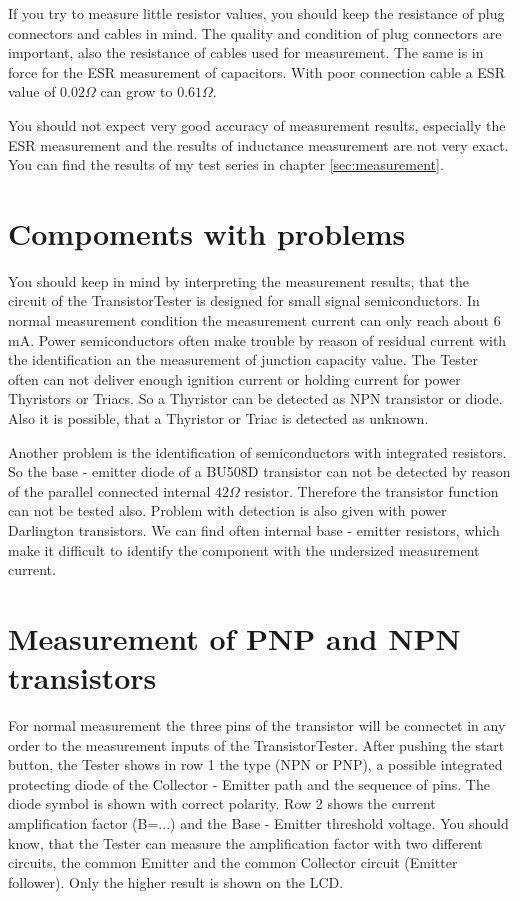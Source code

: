 If you try to measure little resistor values, you should keep the resistance of plug connectors and cables in mind.
The quality and condition of plug connectors are important, also the resistance of cables used for measurement.
The same is in force for the ESR measurement of capacitors.
With poor connection cable a ESR value of \(0.02 \Omega\) can grow to \(0.61 \Omega\).

You should not expect very good accuracy of measurement results, especially the ESR measurement and the results of inductance measurement are not very exact.
You can find the results of my test series in chapter \ref{sec:measurement}.

\section{Compoments with problems}
You should keep in mind by interpreting the measurement results, that the circuit of the TransistorTester is
designed for small signal semiconductors. In normal measurement condition the measurement current can only reach about 6 mA.
Power semiconductors often make trouble by reason of residual current with the identification an the measurement of junction capacity value.
The Tester often can not deliver enough ignition current or holding current for power Thyristors or Triacs.
So a Thyristor can be detected as NPN transistor or diode. Also it is possible, that a Thyristor or Triac is detected as unknown.

Another problem is the identification of semiconductors with integrated resistors.
So the base - emitter diode of a BU508D transistor can not be detected by reason of the parallel connected
internal \(42 \Omega\) resistor.
Therefore the transistor function can not be tested also.
Problem with detection is also given with power Darlington transistors. We can find often internal
base - emitter resistors, which make it difficult to identify the component with the undersized measurement current.

\section{Measurement of PNP and NPN transistors}
For normal measurement the three pins of the transistor will be connectet in any order to the measurement
inputs of the TransistorTester.
After pushing the start button, the Tester shows in row 1 the type (NPN or PNP), 
a possible integrated protecting diode of the Collector - Emitter path and the
sequence of pins. The diode symbol is shown with correct polarity.
Row 2 shows the current amplification factor (B=...) and the Base - Emitter threshold voltage.
You should know, that the Tester can measure the amplification factor with two different circuits,
the common Emitter and the common Collector circuit (Emitter follower).
Only the higher result is shown on the LCD.


